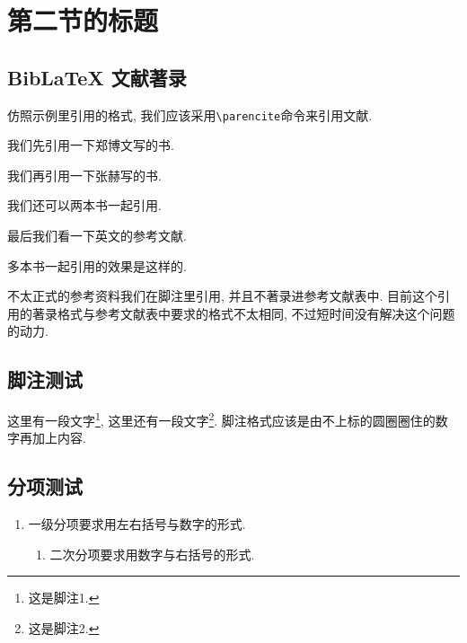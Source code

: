 
\section{第二节的标题}

\zhlipsum[1]

\subsection{BibLaTeX 文献著录}

\nocite{*}

仿照示例里引用的格式, 我们应该采用\verb|\parencite|命令来引用文献.

我们先引用一下郑博文写的书\parencite{rudin1976principleschinese3}.

我们再引用一下张赫写的书\parencite{rudin1976principleschinese}.

我们还可以两本书一起引用\parencite{rudin1976principleschinese,rudin1976principleschinese3}.

最后我们看一下英文的参考文献\parencite{rudin1976principles}.

多本书一起引用的效果是这样的\parencite{rudin1976principleschinese,rudin1976principleschinese3, rudin1976principles, rudin1976principleschinese2}.

不太正式的参考资料我们在脚注里引用, 并且不著录进参考文献表中. 目前这个引用的著录格式与参考文献表中要求的格式不太相同, 不过短时间没有解决这个问题的动力.

\zhlipsum[1]

\subsection{脚注测试}

这里有一段文字\footnote{这是脚注1.}, 这里还有一段文字\footnote{这是脚注2.}. 脚注格式应该是由不上标的圆圈圈住的数字再加上内容.

\zhlipsum

\subsection{分项测试}

\begin{enumerate}
  \item 一级分项要求用左右括号与数字的形式.
  \begin{enumerate}
    \item 二次分项要求用数字与右括号的形式.
  \end{enumerate}
\end{enumerate}

\zhlipsum[1]
